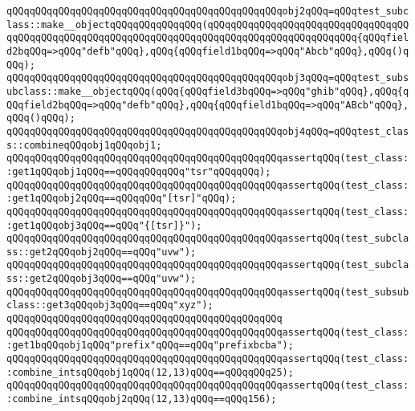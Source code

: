 \verb|qQQqqQQqqQQqqQQqqQQqqQQqqQQqqQQqqQQqqQQqqQQqqQQqobj2qQQq=qQQqtest_subclass::make__objectqQQqqQQqqQQqqQQq(qQQqqQQqqQQqqQQqqQQqqQQqqQQqqQQqqQQqqQQqqQQqqQQqqQQqqQQqqQQqqQQqqQQqqQQqqQQqqQQqqQQqqQQqqQQqqQQq{qQQqfield2bqQQq=>qQQq"defb"qQQq},qQQq{qQQqfield1bqQQq=>qQQq"Abcb"qQQq},qQQq()qQQq);|\newline
\verb|qQQqqQQqqQQqqQQqqQQqqQQqqQQqqQQqqQQqqQQqqQQqqQQqobj3qQQq=qQQqtest_subsubclass::make__objectqQQq(qQQq{qQQqfield3bqQQq=>qQQq"ghib"qQQq},qQQq{qQQqfield2bqQQq=>qQQq"defb"qQQq},qQQq{qQQqfield1bqQQq=>qQQq"ABcb"qQQq},qQQq()qQQq);|\newline
\verb|qQQqqQQqqQQqqQQqqQQqqQQqqQQqqQQqqQQqqQQqqQQqqQQqobj4qQQq=qQQqtest_class::combineqQQqobj1qQQqobj1;|\newline
\newline
\verb|qQQqqQQqqQQqqQQqqQQqqQQqqQQqqQQqqQQqqQQqqQQqqQQqassertqQQq(test_class::get1qQQqobj1qQQq==qQQqqQQqqQQq"tsr"qQQqqQQq);|\newline
\verb|qQQqqQQqqQQqqQQqqQQqqQQqqQQqqQQqqQQqqQQqqQQqqQQqassertqQQq(test_class::get1qQQqobj2qQQq==qQQqqQQq"[tsr]"qQQq);|\newline
\verb|qQQqqQQqqQQqqQQqqQQqqQQqqQQqqQQqqQQqqQQqqQQqqQQqassertqQQq(test_class::get1qQQqobj3qQQq==qQQq"{[tsr]}");|\newline
\newline
\verb|qQQqqQQqqQQqqQQqqQQqqQQqqQQqqQQqqQQqqQQqqQQqqQQqassertqQQq(test_subclass::get2qQQqobj2qQQq==qQQq"uvw");|\newline
\verb|qQQqqQQqqQQqqQQqqQQqqQQqqQQqqQQqqQQqqQQqqQQqqQQqassertqQQq(test_subclass::get2qQQqobj3qQQq==qQQq"uvw");|\newline
\newline
\verb|qQQqqQQqqQQqqQQqqQQqqQQqqQQqqQQqqQQqqQQqqQQqqQQqassertqQQq(test_subsubclass::get3qQQqobj3qQQq==qQQq"xyz");|\newline
\verb|qQQqqQQqqQQqqQQqqQQqqQQqqQQqqQQqqQQqqQQqqQQqqQQq|\newline
\verb|qQQqqQQqqQQqqQQqqQQqqQQqqQQqqQQqqQQqqQQqqQQqqQQqassertqQQq(test_class::get1bqQQqobj1qQQq"prefix"qQQq==qQQq"prefixbcba");|\newline
\newline
\verb|qQQqqQQqqQQqqQQqqQQqqQQqqQQqqQQqqQQqqQQqqQQqqQQqassertqQQq(test_class::combine_intsqQQqobj1qQQq(12,13)qQQq==qQQqqQQq25);|\newline
\verb|qQQqqQQqqQQqqQQqqQQqqQQqqQQqqQQqqQQqqQQqqQQqqQQqassertqQQq(test_class::combine_intsqQQqobj2qQQq(12,13)qQQq==qQQq156);|\newline
\newline
